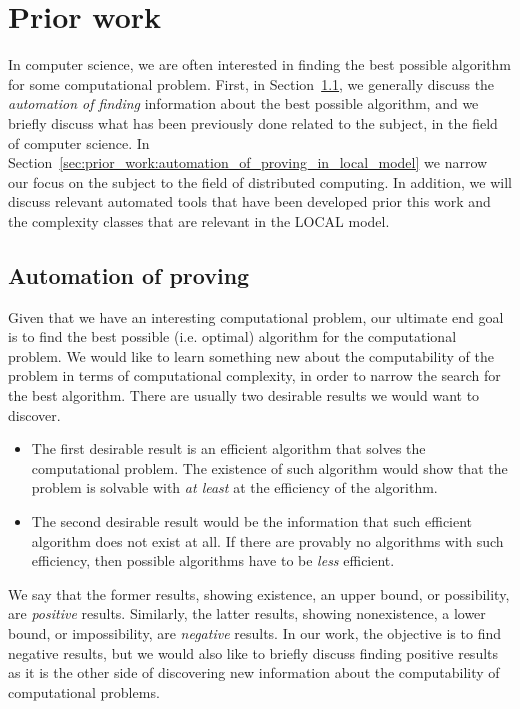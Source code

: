 
\section{Prior work} \label{sec:prior_work}
In computer science, we are often interested in finding the best possible algorithm for some computational problem.
First, in Section~\ref{sec:prior_work:automation_of_proving}, we generally discuss the \emph{automation of finding} information about the best possible algorithm, and we briefly discuss what has been previously done related to the subject, in the field of computer science.
In Section~\ref{sec:prior_work:automation_of_proving_in_local_model} we narrow our focus on the subject to the field of distributed computing.
In addition, we will discuss relevant automated tools that have been developed prior this work and the complexity classes that are relevant in the LOCAL model.

\subsection{Automation of proving} \label{sec:prior_work:automation_of_proving} %
Given that we have an interesting computational problem, our ultimate end goal is to find the best possible (i.e. optimal) algorithm for the computational problem.
We would like to learn something new about the computability of the problem in terms of computational complexity, in order to narrow the search for the best algorithm.
There are usually two desirable results we would want to discover.
\begin{itemize}
    \item
    The first desirable result is an efficient algorithm that solves the computational problem.
    The existence of such algorithm would show that the problem is solvable with \emph{at least} at the efficiency of the algorithm.
    \item
    The second desirable result would be the information that such efficient algorithm does not exist at all.
    If there are provably no algorithms with such efficiency, then possible algorithms have to be \emph{less} efficient.
\end{itemize}
We say that the former results, showing existence, an upper bound, or possibility, are \emph{positive} results.
Similarly, the latter results, showing nonexistence, a lower bound, or impossibility, are \emph{negative} results.
In our work, the objective is to find negative results, but we would also like to briefly discuss finding positive results as it is the other side of discovering new information about the computability of computational problems.

